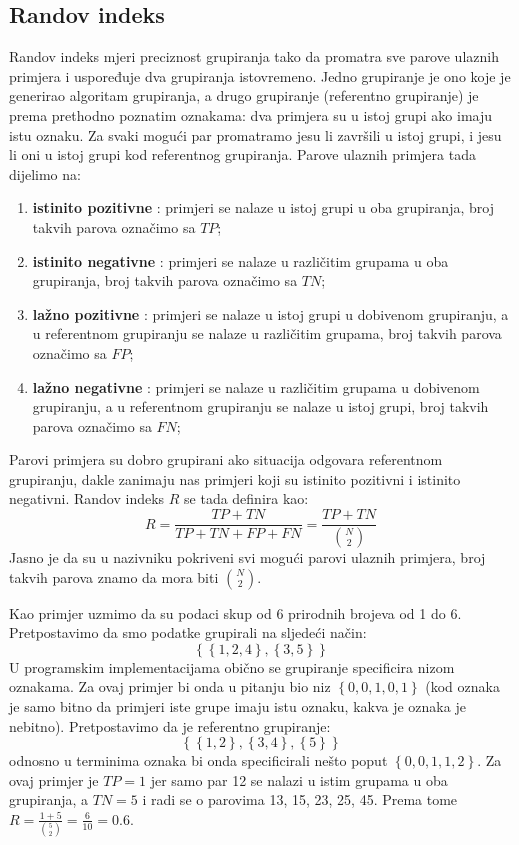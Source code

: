 \documentclass[times, utf8, zavrsni]{fer}
\begin{document}
\subsection{Randov indeks}
Randov indeks mjeri preciznost grupiranja tako da promatra sve parove ulaznih primjera i uspoređuje dva grupiranja istovremeno. Jedno grupiranje je ono koje je generirao algoritam grupiranja, a drugo grupiranje (referentno grupiranje) je prema prethodno poznatim oznakama: dva primjera su u istoj grupi ako imaju istu oznaku. Za svaki mogući par promatramo jesu li završili u istoj grupi, i jesu li oni u istoj grupi kod referentnog grupiranja. Parove ulaznih primjera tada dijelimo na:
\begin{enumerate}
    \item \textbf{istinito pozitivne} : primjeri se nalaze u istoj grupi u oba grupiranja, broj takvih parova označimo sa $TP$;
    \item \textbf{istinito negativne} : primjeri se nalaze u različitim grupama u oba grupiranja, broj takvih parova označimo sa $TN$;
    \item \textbf{lažno pozitivne} : primjeri se nalaze u istoj grupi u dobivenom grupiranju, a u referentnom grupiranju se nalaze u različitim grupama, broj takvih parova označimo sa $FP$;
    \item \textbf{lažno negativne} : primjeri se nalaze u različitim grupama u dobivenom grupiranju, a u referentnom grupiranju se nalaze u istoj grupi, broj takvih parova označimo sa $FN$;
\end{enumerate}

Parovi primjera su dobro grupirani ako situacija odgovara referentnom grupiranju, dakle zanimaju nas primjeri koji su istinito pozitivni i istinito negativni.
Randov indeks $R$ se tada definira kao:
\[R = \frac{TP + TN}{TP + TN + FP + FN} = \frac{TP + TN}{\binom{N}{2}}\]
Jasno je da su u nazivniku pokriveni svi mogući parovi ulaznih primjera, broj takvih parova znamo da mora biti $\binom{N}{2}$.

Kao primjer uzmimo da su podaci skup od 6 prirodnih brojeva od 1 do 6. Pretpostavimo da smo podatke grupirali na sljedeći način:
\[\left\{ \left\{1, 2, 4\right\}, \left\{3, 5\right\} \right\}\]
U programskim implementacijama obično se grupiranje specificira nizom oznakama. Za ovaj primjer bi onda u pitanju bio niz $\left\{0, 0, 1, 0, 1\right\}$ (kod oznaka je samo bitno da primjeri iste grupe imaju istu oznaku, kakva je oznaka je nebitno). Pretpostavimo da je referentno grupiranje:
\[\left\{\left\{1,2\right\}, \left\{3,4\right\}, \left\{5\right\}\right\}\]
odnosno u terminima oznaka bi onda specificirali nešto poput $\left\{0, 0, 1, 1, 2\right\}$.
Za ovaj primjer je $TP = 1$ jer samo par 12 se nalazi u istim grupama u oba grupiranja, a $TN = 5$ i radi se o parovima 13, 15, 23, 25, 45. Prema tome $R = \frac{1 + 5}{\binom{5}{2}} = \frac{6}{10} = 0.6$.
\end{document}

